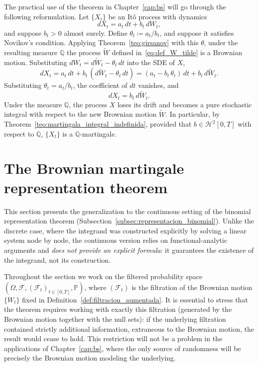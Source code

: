 \documentclass[11pt,a4paper,oneside]{report}
\theoremstyle{plain}
\theoremstyle{definition}
\theoremstyle{remark}
\newcommand{\PP}{\mathbb{P}}
\newcommand{\Q}{\mathbb{Q}}
\newcommand{\F}{\mathcal{F}}
\newcommand{\1}{\mathbf{1}}
\newcommand{\eqdef}{\coloneqq}
\begin{document}
The
practical use of the theorem in Chapter~\ref{cap:bs} will go through
the following reformulation. Let $\{X_t\}$ be an Itô process with
dynamics
\begin{equation*}
  dX_t = a_t\, dt + b_t\, dW_t,
\end{equation*}
and suppose $b_t > 0$ almost surely. Define
$\theta_t \eqdef a_t / b_t$, and suppose it satisfies Novikov's
condition. Applying Theorem~\ref{teo:girsanov} with this $\theta$,
under the resulting measure $\Q$ the process $\widetilde{W}$ defined
in~\eqref{eq:def_W_tilde} is a Brownian motion. Substituting
$dW_t = d\widetilde{W}_t - \theta_t\, dt$ into the SDE of $X$,
\begin{equation*}
  dX_t = a_t\, dt + b_t\, (d\widetilde{W}_t - \theta_t\, dt)
       = (a_t - b_t\, \theta_t)\, dt + b_t\, d\widetilde{W}_t.
\end{equation*}
Substituting $\theta_t = a_t/b_t$, the coefficient of $dt$ vanishes,
and
\begin{equation}\label{eq:girsanov_operativo}
  \boxed{\; dX_t = b_t\, d\widetilde{W}_t. \;}
\end{equation}
Under the measure $\Q$, the process $X$ loses its drift and becomes a
pure stochastic integral with respect to the new Brownian motion
$\widetilde{W}$. In particular, by
Theorem~\ref{teo:martingala_integral_indefinida}, provided that $b \in \mathcal{H}^2[0, T]$ with respect to $\Q$, $\{X_t\}$ is a
$\Q$-martingale.
\section{The Brownian martingale representation theorem}
\label{sec:representacion_martingalas}

This section presents the generalization to the continuous setting of
the binomial representation theorem
(Subsection~\ref{subsec:representacion_binomial}). Unlike the
discrete case, where the integrand was constructed explicitly by
solving a linear system node by node, the continuous version relies
on functional-analytic arguments and \emph{does not provide an
explicit formula}: it guarantees the existence of the integrand, not
its construction.

\medskip

Throughout the section we work on the filtered probability space
$(\Omega, \F, (\F_t)_{t \in [0, T]}, \PP)$, where $(\F_t)$ is the
filtration of the Brownian motion $\{W_t\}$ fixed in
Definition~\ref{def:filtracion_aumentada}. It is essential to stress
that the theorem requires working with exactly this filtration
(generated by the Brownian motion together with the null sets): if
the underlying filtration contained strictly additional information,
extraneous to the Brownian motion, the result would cease to hold.
This restriction will not be a problem in the applications of
Chapter~\ref{cap:bs}, where the only source of randomness will be
precisely the Brownian motion modeling the underlying.
\end{document}
